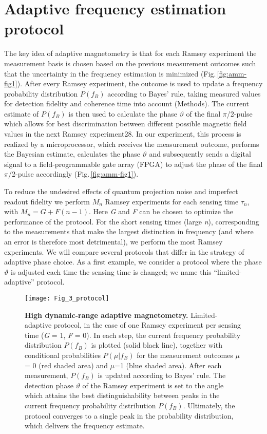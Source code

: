 \section{Adaptive frequency estimation protocol}
The key idea of adaptive magnetometry is that for each Ramsey experiment the measurement basis is chosen based on the previous measurement outcomes such that the uncertainty in the frequency estimation is minimized (Fig.\,\ref{fig:amm-fig1}). After every Ramsey experiment, the outcome is used to update a frequency probability distribution $P(f_B)$ according to Bayes’ rule, taking measured values for detection fidelity and coherence time into account (Methods). The current estimate of $P(f_B)$ is then used to calculate the phase $\vartheta$ of the final $\pi$/2-pulse which allows for best discrimination between different possible magnetic field values in the next Ramsey experiment28. In our experiment, this process is realized by a microprocessor, which receives the measurement outcome, performs the Bayesian estimate, calculates the  phase $\vartheta$ and subsequently sends a digital signal to a field-programmable gate array (FPGA) to adjust the phase of the final $\pi$/2-pulse accordingly (Fig.\,\ref{fig:amm-fig1}).

To reduce the undesired effects of quantum projection noise and imperfect readout fidelity we perform $M_n$ Ramsey experiments\cite{Said_Phys.Rev.B_2011} for each sensing time $\tau_n$, with  $M_n = G + F (n-1)$. Here \textit{G} and \textit{F} can be chosen to optimize the performance of the protocol. For the short sensing times (large \textit{n}), corresponding to the measurements that make the largest distinction in frequency (and where an error is therefore most detrimental), we  perform the most Ramsey experiments. We will compare several protocols that differ in the strategy of adaptive phase choice. As a first example, we consider a protocol where the phase $\vartheta$ is adjusted each time the sensing time is changed; we name this “limited-adaptive” protocol. 

\begin{figure*}
	\centering
	\texttt{[image: Fig\_3\_protocol]}
	\caption{\label{fig:amm-fig3} \textbf{High dynamic-range adaptive magnetometry.} Limited-adaptive protocol, in the case of one Ramsey experiment per sensing time (\textit{G} = 1, \textit{F} = 0). In each step, the current frequency probability distribution $P(f_B)$ is plotted (solid black line), together with conditional probabilities $P(\mu|f_B)$ for the measurement outcomes $\mu$ = 0 (red shaded area) and $\mu$=1 (blue shaded area). After each measurement,  $P(f_B)$ is updated according to Bayes’ rule. The detection phase $\vartheta$ of the Ramsey experiment is set to the angle which attains the best distinguishability between peaks in the current frequency probability distribution $P(f_B)$. Ultimately, the protocol converges to a single peak in the probability distribution, which delivers the frequency estimate.}
\end{figure*}


